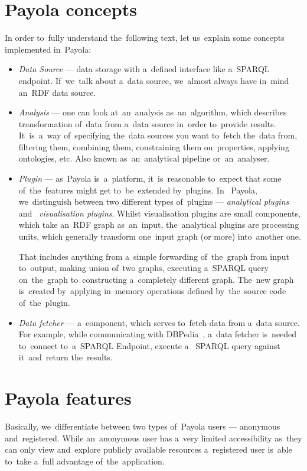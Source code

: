 \section{Payola concepts}
In order to~fully understand the~following text, let us~explain some concepts 
implemented in~Payola:
\begin{itemize}
  \item \emph{Data Source} --- data storage with a~defined interface like a~SPARQL endpoint.
  If~we~talk about a~data source, we~almost always have in~mind an~RDF data source.
  
  \item \emph{Analysis} --- one can look at~an~analysis as~an~algorithm, which 
  describes transformation of~data from a~data source in~order to~provide results. 
  It~is~a~way of~specifying the~data sources you want to~fetch the~data from, 
  filtering them, combining them, constraining them on~properties, applying 
  ontologies, etc. Also known as~an~analytical pipeline or~an~analyser.  
  
  \item \emph{Plugin} --- as~Payola is~a~platform, it~is~reasonable to~expect that 
  some of~the~features might get to~be~extended by~plugins. In~  Payola, we~distinguish between two different types of~plugins --- \emph{analytical plugins} and~  \emph{visualisation plugins}. Whilst visualisation plugins are small components, 
  which take an~RDF graph as~an~input, the~analytical plugins are processing 
  units, which generally transform one~input graph (or more) into~another one.
  
  That includes anything from a~simple forwarding of~the~graph from input to~output, 
  making union of~two graphs, executing a~SPARQL query on~the~graph to~constructing 
  a~completely different graph. The~new graph is~created by~applying in--memory
  operations defined by~the~source code of~the~plugin.
  
  \item \emph{Data fetcher} --- a~component, which serves to~fetch data from a~data 
  source. For example, while communicating with DBPedia~\cite{dbpedia},
  a~data fetcher is~needed to~connect to~a~SPARQL Endpoint, execute a~  SPARQL query against it~and~return the~results.
\end{itemize}

\section{Payola features}
Basically, we~differentiate between two types of~Payola users --- anonymous and~registered. 
While an~anonymous user has a~very limited accessibility as~they can only 
view and~explore publicly available resources a~registered user is~able to~take a~full advantage of~the~application.

